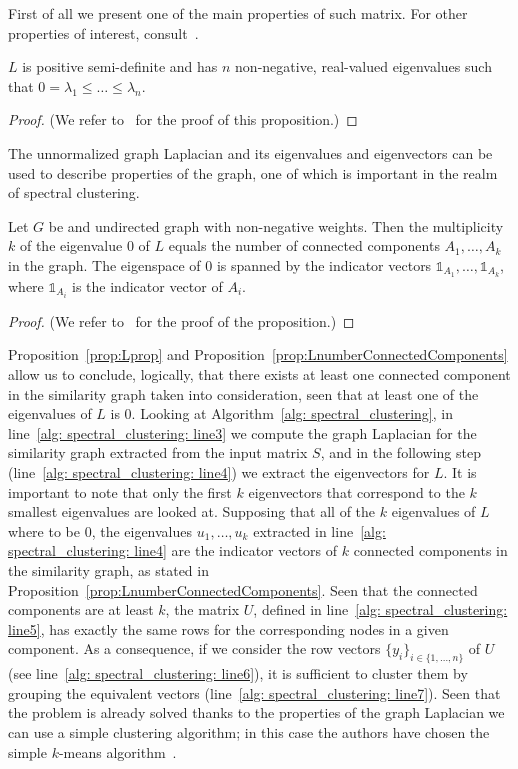 First of all we present one of the main properties of such matrix. For other properties of interest, consult~\cite{von2007SP}.
\begin{proposition}[Property of $L$]\label{prop:Lprop}
    $L$ is positive semi-definite and has $n$ non-negative, real-valued eigenvalues such that $0=\lambda_1\leq\dots\leq\lambda_n$.
\end{proposition}
\begin{proof}
    (We refer to~\cite{von2007SP} for the proof of this proposition.)
\end{proof}

The unnormalized graph Laplacian and its eigenvalues and eigenvectors can be used to describe properties of the graph, one of which is important in the realm of spectral clustering.
\begin{proposition}\label{prop:LnumberConnectedComponents}
    Let $G$ be and undirected graph with non-negative weights. Then the multiplicity $k$ of the eigenvalue 0 of $L$ equals the number of connected components $A_1,\dots,A_k$ in the graph. The eigenspace of 0 is spanned by the indicator vectors $\mathds{1}_{A_1},\dots,\mathds{1}_{A_k}$, where $\mathds{1}_{A_i}$ is the indicator vector of $A_i$.
\end{proposition}
\begin{proof}
    (We refer to~\cite{von2007SP} for the proof of the proposition.)
\end{proof}

Proposition~\ref{prop:Lprop} and Proposition~\ref{prop:LnumberConnectedComponents} allow us to conclude, logically, that there exists at least one connected component in the similarity graph taken into consideration, seen that at least one of the eigenvalues of $L$ is 0. Looking at Algorithm~\ref{alg: spectral_clustering}, in line~\ref{alg: spectral_clustering: line3} we compute the graph Laplacian for the similarity graph extracted from the input matrix $S$, and in the following step (line~\ref{alg: spectral_clustering: line4}) we extract the eigenvectors for $L$. It is important to note that only the first $k$ eigenvectors that correspond to the $k$ smallest eigenvalues are looked at. Supposing that all of the $k$ eigenvalues of $L$ where to be 0, the eigenvalues $u_1,\dots,u_k$ extracted in line~\ref{alg: spectral_clustering: line4} are the indicator vectors of $k$ connected components in the similarity graph, as stated in Proposition~\ref{prop:LnumberConnectedComponents}. Seen that the connected components are at least $k$, the matrix $U$, defined in line~\ref{alg: spectral_clustering: line5}, has exactly the same rows for the corresponding nodes in a given component. As a consequence, if we consider the row vectors $\{y_i\}_{i\in\{1,\dots,n\}}$ of $U$ (see line~\ref{alg: spectral_clustering: line6}), it is sufficient to cluster them by grouping the equivalent vectors (line~\ref{alg: spectral_clustering: line7}). Seen that the problem is already solved thanks to the properties of the graph Laplacian we can use a simple clustering algorithm; in this case the authors have chosen the simple $k$-means algorithm~\cite{Hastie2009ElementsStatisticalLearning}.

